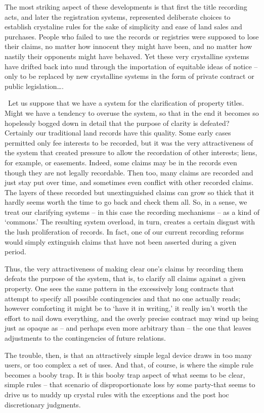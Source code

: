 The most striking aspect of these developments is that first the title recording
acts, and later the registration systems, represented deliberate choices to
establish crystaline rules for the sake of simplicity and ease of land sales
and purchases. People who failed to use the records or registries were supposed
to lose their claims, no matter how innocent they might have been, and no
matter how nastily their opponents might have behaved. Yet these very
crystalline systems have drifted back into mud through the importation of
equitable ideas of notice -- only to be replaced by new crystalline systems in
the form of private contract or public legislation\dots{}.

~Let us suppose that we have a system for the clarification of property titles.
Might we have a tendency to overuse the system, so that in the end it becomes
so hopelessly bogged down in detail that the purpose of clarity is defeated?
Certainly our traditional land records have this quality. Some early cases
permitted only fee interests to be recorded, but it was the very attractiveness
of the system that created pressure to allow the recordation of other
interests; liens, for example, or easements. Indeed, some claims may be in the
records even though they are not legally recordable. Then too, many claims are
recorded and just stay put over time, and sometimes even conflict with other
recorded claims. The layers of these recorded but unextinguished claims can
grow so thick that it hardly seems worth the time to go back and check them
all. So, in a sense, we treat our clarifying systems -- in this case the
recording mechanisms -- as a kind of `commons.' The resulting system overload,
in turn, creates a certain disgust with the lush proliferation of records. In
fact, one of our current recording reforms would simply extinguish claims that
have not been asserted during a given period. 

Thus, the very attractiveness of making clear one's claims by recording them
defeats the purpose of the system, that is, to clarify all claims against a
given property. One sees the same pattern in the excessively\textbf{ }long
contracts that attempt to specify all possible contingencies and that no one
actually reads; however comforting it might be to `have it in writing,' it
really isn't worth the effort to nail down everything, and the overly precise
contract may wind up being just as opaque as -- and perhaps even more arbitrary
than -- the one that leaves adjustments to the contingencies of future
relations. 

The trouble, then, is that an attractively simple legal device draws in too many
users, or too complex a set of uses. And that, of course, is where the simple
rule becomes a booby trap. It is this booby trap aspect of what seems to be
clear, simple rules -- that scenario of disproportionate loss by some
party-that seems to drive us to muddy up crystal rules with the exceptions and
the post hoc discretionary judgments.

